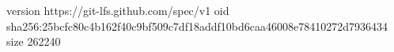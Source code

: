version https://git-lfs.github.com/spec/v1
oid sha256:25bcfc80c4b162f40c9bf509c7df18addf10bd6caa46008e78410272d7936434
size 262240
